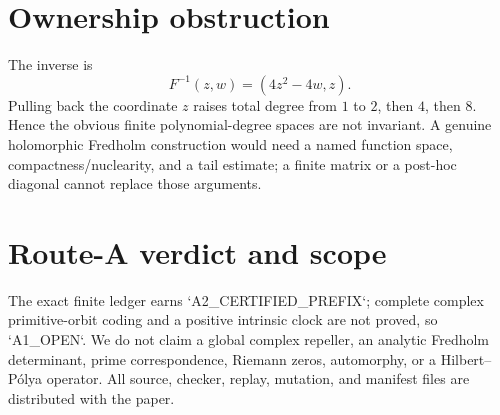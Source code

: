 \documentclass[10pt]{article}
\begin{document}
\section{Ownership obstruction}
The inverse is
\[
F^{-1}(z,w)=(4z^2-4w,z).
\]
Pulling back the coordinate $z$ raises total degree from $1$ to $2$, then $4$,
then $8$.  Hence the obvious finite polynomial-degree spaces are not
invariant.  A genuine holomorphic Fredholm construction would need a named
function space, compactness/nuclearity, and a tail estimate; a finite matrix
or a post-hoc diagonal cannot replace those arguments.

\section{Route-A verdict and scope}
The exact finite ledger earns `A2\_CERTIFIED\_PREFIX`; complete complex
primitive-orbit coding and a positive intrinsic clock are not proved, so
`A1\_OPEN`.  We do not claim a global complex repeller, an analytic Fredholm
determinant, prime correspondence, Riemann zeros, automorphy, or a
Hilbert--P\'olya operator.  All source, checker, replay, mutation, and
manifest files are distributed with the paper.
\end{document}

